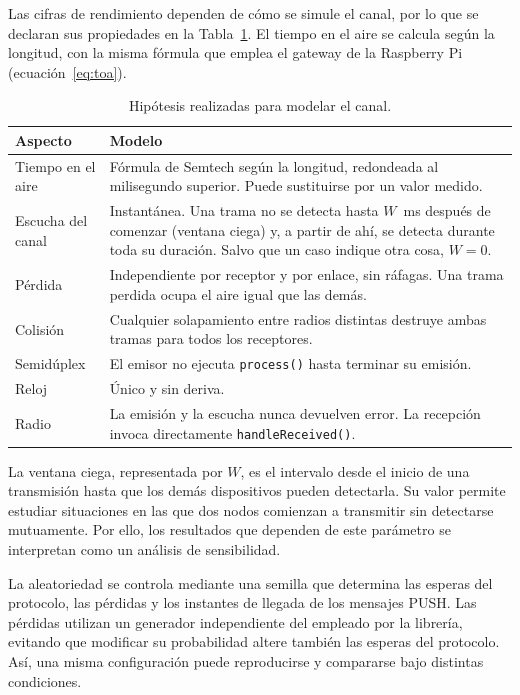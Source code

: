 Las cifras de rendimiento dependen de cómo se simule el canal, por lo que se declaran sus propiedades en la Tabla~\ref{tab:modelo-canal}. El tiempo en el aire se calcula según la longitud, con la misma fórmula que emplea el gateway de la Raspberry Pi (ecuación~\ref{eq:toa}).

\begin{table}[H]
\centering
\caption{\label{tab:modelo-canal} Hipótesis realizadas para modelar el canal.}
\begin{tabular}{|p{2.8cm}|p{11.3cm}|}
\hline
\textbf{Aspecto} & \textbf{Modelo} \\
\hline
Tiempo en el aire & Fórmula de Semtech según la longitud, redondeada al milisegundo superior. Puede sustituirse por un valor medido. \\
\hline
Escucha del canal & Instantánea. Una trama no se detecta hasta $W$~ms después de comenzar (ventana ciega) y, a partir de ahí, se detecta durante toda su duración. Salvo que un caso indique otra cosa, $W = 0$. \\
\hline
Pérdida & Independiente por receptor y por enlace, sin ráfagas. Una trama perdida ocupa el aire igual que las demás. \\
\hline
Colisión & Cualquier solapamiento entre radios distintas destruye ambas tramas para todos los receptores. \\
\hline
Semidúplex & El emisor no ejecuta \texttt{process()} hasta terminar su emisión. \\
\hline
Reloj & Único y sin deriva. \\
\hline
Radio & La emisión y la escucha nunca devuelven error. La recepción invoca directamente \texttt{handleReceived()}. \\
\hline
\end{tabular}
\end{table}

La ventana ciega, representada por $W$, es el intervalo desde el inicio de una transmisión hasta que los demás dispositivos pueden detectarla. Su valor permite estudiar situaciones en las que dos nodos comienzan a transmitir sin detectarse mutuamente. Por ello, los resultados que dependen de este parámetro se interpretan como un análisis de sensibilidad.

La aleatoriedad se controla mediante una semilla que determina las esperas del protocolo, las pérdidas y los instantes de llegada de los mensajes PUSH. Las pérdidas utilizan un generador independiente del empleado por la librería, evitando que modificar su probabilidad altere también las esperas del protocolo. Así, una misma configuración puede reproducirse y compararse bajo distintas condiciones.

